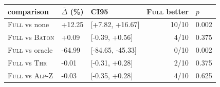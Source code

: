 \begin{tabular}{lllrl}
\toprule
comparison & $\bar\Delta$ (\%) & CI95 & \textsc{Full} better & $p$ \\
\midrule
\textsc{Full} vs none & +12.25 & [+7.82, +16.67] & 10/10 & 0.002 \\
\textsc{Full} vs \textsc{Baton} & +0.09 & [-0.39, +0.56] & 4/10 & 0.375 \\
\textsc{Full} vs oracle & -64.99 & [-84.65, -45.33] & 0/10 & 0.002 \\
\textsc{Full} vs \textsc{Thr} & -0.01 & [-0.31, +0.28] & 2/10 & 0.375 \\
\textsc{Full} vs \textsc{Alp-Z} & -0.03 & [-0.35, +0.28] & 4/10 & 0.625 \\
\bottomrule
\end{tabular}
